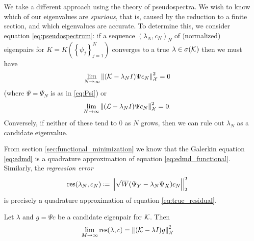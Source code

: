 We take a different approach using the theory of pseudospectra. We wish to know which of 
our eigenvalues are \emph{spurious}, that is, caused by the reduction to a finite section, 
and which eigenvalues are accurate. To determine this, we consider equation 
\ref{eq:pseudospectrum}: if a sequence $(\lambda_N, c_N)_N$ of (normalized) eigenpairs for 
$K = K(\left\{ \psi_j \right\}_{j=1}^N)$ converges to a true $\lambda \in \sigma (\mathcal{K})$ 
then we must have 
\begin{equation}
    \label{eq:true_residual}
    \lim_{N \to \infty} \left\| (\mathcal{K} - \lambda_N I) \Psi c_N \right\|_{\mathcal{X}}^2 = 0
\end{equation}
(where $\Psi = \Psi_N$ is as in \ref{eq:Psi}) or 
\begin{equation}
    \lim_{N \to \infty} \left\| (\mathcal{L} - \lambda_N I) \Psi c_N \right\|_{\mathcal{X}}^2 = 0 . 
\end{equation}
Conversely, if neither of these tend to $0$ as $N$ grows, then we can rule out 
$\lambda_N$ as a candidate eigenvalue. 

From section \ref{sec:functional_minimization} we know that the Galerkin equation 
\ref{eq:edmd} is a quadrature approximation of equation \ref{eq:edmd_functional}. 
Similarly, the \emph{regression error}
\begin{equation}
    \label{eq:res}
    \res (\lambda_N, c_N) \defeq \left\| \sqrt{W} (\YY - \lambda_N \YX) c_N \right\|_2^2
\end{equation}
is precisely a quadrature approximation of equation \ref{eq:true_residual}. 

\begin{proposition}
    Let $\lambda$ and $g = \Psi c$ be a candidate eigenpair for $\mathcal{K}$. Then 
    \begin{equation}
        \lim_{M \to \infty} \text{res} (\lambda, c)
        = \left\| (\mathcal{K} - \lambda I) g \right\|_{\mathcal{X}}^2
    \end{equation}
\end{proposition}

